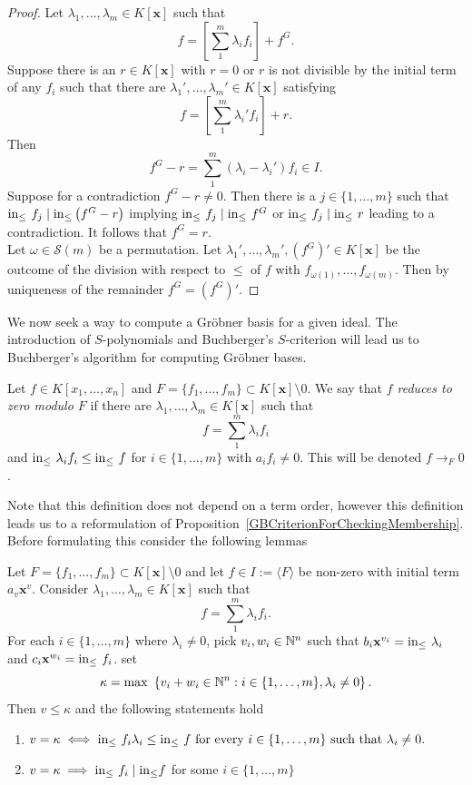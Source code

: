 \begin{proof}
    Let $\lambda_1,\dots,\lambda_m\in K[\mathbf{x}]$ such that 
    $$f= \left[\sum_1^m \lambda_if_i\right] + f^G.$$
    Suppose there is an $r\in K[\mathbf{x}]$ with $r=0$ or $r$ is not divisible by the initial term of any $f_i$ such that there are $\lambda_1',\dots,\lambda_m'\in K[\mathbf{x}]$ satisfying 
    $$f = \left[\sum_1^m\lambda_i'f_i\right] + r.$$
    Then 
    $$f^G-r = \sum_1^m (\lambda_i-\lambda_i')f_i\in I.$$
    Suppose for a contradiction $f^G-r\neq 0$. Then there is a $j\in\{1,\dots,m\}$ such that $\mathrm{in}_\leq\ f_j \mid \mathrm{in}_\leq\left(f^G-r\right)$ implying $\inn\ f_j \mid \inn\ f^G$ or $\mathrm{in}_\leq\ f_j\mid \mathrm{in}_\leq\ r$ leading to a contradiction. It follows that $f^G =r$.\\
    Let $\omega \in \mathcal{S}(m)$ be a permutation. 
    Let $\lambda_1',\dots,\lambda_m',(f^G)'\in K[\mathbf{x}]$ be the 
    outcome of the division with respect to $\leq$ of $f$ with $f_{\omega(1)},\dots,f_{\omega(m)}$. Then by uniqueness of the remainder $f^G=(f^G)'$.
\end{proof}
 We now seek a way to compute a Gröbner basis for a given ideal. The introduction of $S$-polynomials and Buchberger's $S$-criterion will lead us to Buchberger's algorithm for computing Gröbner bases.
\begin{definition}
    Let $f\in K[x_1,\dots,x_n]$ and $F=\{f_1,\dots,f_m\}\subset K[\mathbf{x}]\setminus 0$. We say that \textit{$f$ reduces to zero modulo $F$} if there are $\lambda_1,\dots,\lambda_m\in K[\mathbf{x}]$ such that 
    $$f = \sum_1^m \lambda_if_i$$
    and $\mathrm{in}_\leq\ \lambda_if_i \leq \mathrm{in}_\leq\ f$ for $i\in\{1,\dots,m\}$ with $a_if_i\neq 0$. This will be denoted $f\to_F 0$.
\end{definition}
Note that this definition does not depend on a term order, however this definition leads us to a reformulation of Proposition~\ref{GBCriterionForCheckingMembership}. Before formulating this consider the following lemmas 
\begin{lemma}\label{ConditionsForVanishingInitialTerms}
    Let $F=\{f_1,\dots,f_m\}\subset K[\mathbf{x}]\setminus 0$ and let $f \in I:=\langle F\rangle$ be non-zero with initial term $a_v\mathbf{x}^v$. Consider $\lambda_1,\dots,\lambda_m\in K[\mathbf{x}]$ such that 
    $$f=\sum_1^m \lambda_if_i.$$
    For each $i\in\{1,\dots,m\}$ where $\lambda_i\neq 0$, pick $v_i,w_i\in\mathbb{N}^n$ such that $b_{i}\mathbf{x}^{v_i}= \mathrm{in}_\leq\ \lambda_i$ and $c_{i}\mathbf{x}^{w_i}=\mathrm{in}_\leq\ f_i$. set 
    $$\kappa = \max\ \left\{v_i+w_i\in\mathbb{N}^n : i\in\{1,\dots,m\},\lambda_i\neq0 \right\}.$$
    Then $v\leq \kappa$ and the following statements hold
    \begin{enumerate}
        \item $v = \kappa \iff \mathrm{in}_\leq\ f_i\lambda_i \leq \mathrm{in}_\leq\ f \text{ for every } i\in\{1,\dots,m\} \text{ such that } \lambda_i\neq 0.$
        \item $v = \kappa \implies \mathrm{in}_\leq\ f_i \mid \mathrm{in}_\leq f$ for some $i\in\{1,\dots,m\}$
    \end{enumerate}
\end{lemma}
